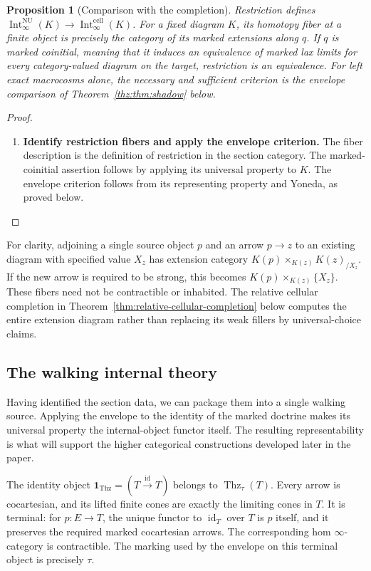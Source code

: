 \documentclass[oneside]{article}
\theoremstyle{plain}
\newtheorem{proposition}[theorem]{Proposition}
\theoremstyle{definition}
\theoremstyle{remark}
\newcommand{\Int}{\operatorname{Int}}
\newcommand{\NU}{\mathrm{NU}}
\newcommand{\Thz}{\operatorname{Thz}}
\newcommand{\id}{\operatorname{id}}
\newcommand{\one}{\mathbf 1}
\begin{document}
\begin{proposition}[Comparison with the completion]\label{prop:shadow-comparison}
Restriction defines
$\Int^{\NU}_\infty(K)\to\Int^{\mathrm{cell}}_\infty(K)$.
For a fixed diagram $K$, its homotopy fiber at a finite object is precisely
the category of its marked extensions along $q$. If $q$ is marked coinitial,
meaning that it induces an equivalence of marked lax limits for every
category-valued diagram on the target, restriction is an equivalence.
For left exact macrocosms alone, the necessary and sufficient criterion is
the envelope comparison of Theorem~\ref{thz:thm:shadow} below.
\end{proposition}
\begin{proof}
\leavevmode
\begin{enumerate}
\item \textbf{Identify restriction fibers and apply the envelope criterion.} The fiber description is the definition of restriction in the section
category. The marked-coinitial assertion follows by applying its universal
property to $K$. The envelope criterion follows from its representing
property and Yoneda, as proved below.\qedhere
\end{enumerate}
\end{proof}

For clarity, adjoining a single source object $p$ and an arrow $p\to z$
to an existing diagram with specified value $X_z$ has extension category
$K(p)\times_{K(z)}K(z)_{/X_z}$. If the new arrow is required to be
strong, this becomes $K(p)\times_{K(z)}\{X_z\}$. These fibers need
not be contractible or inhabited. The relative cellular completion in
Theorem~\ref{thm:relative-cellular-completion} below computes the
entire extension diagram rather than replacing its weak fillers by
universal-choice claims.

\subsection{The walking internal theory}\label{sec:thz:walking}

Having identified the section data, we can package them into a single
walking source. Applying the envelope to the identity of the marked
doctrine makes its universal property the internal-object functor itself.
The resulting representability is what will support the higher
categorical constructions developed later in the paper.

The identity object $\one_{\Thz}=(T\xrightarrow{\id}T)$ belongs to $\Thz_\tau(T)$.  Every arrow is cocartesian, and its lifted
finite cones are exactly the limiting cones in $T$.  It is terminal:
for $p:E\to T$, the unique functor to $\id_T$ over $T$ is $p$ itself,
and it preserves the required marked cocartesian arrows.  The corresponding
hom $\infty$-category is contractible.  The marking used by the envelope
on this terminal object is precisely $\tau$.
\end{document}
